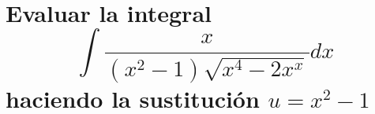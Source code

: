 \chapter*{Evaluar la integral $$\int \frac{x}{(x^2-1)\sqrt{x^4-2x^x}}dx$$ haciendo la sustitución $u=x^2-1$}
